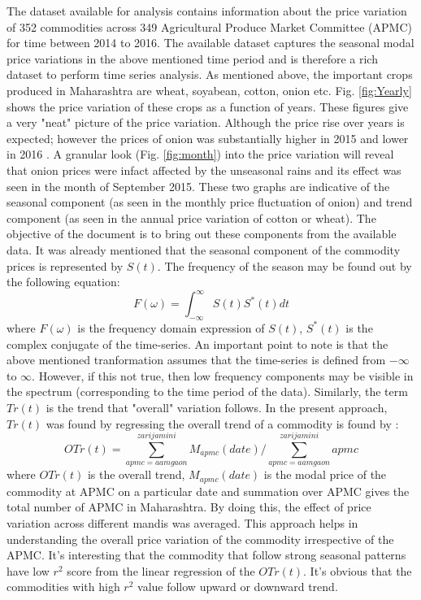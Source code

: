 \documentclass{article}
\begin{document}
The dataset available for analysis contains information about the price variation of 352 commodities across 349 Agricultural Produce Market Committee (APMC) for time between 2014 to 2016. The available dataset captures the seasonal modal price variations in the above mentioned time period and is therefore a rich dataset to perform time series analysis. As mentioned above, the important crops produced in Maharashtra are wheat, soyabean, cotton, onion etc. Fig. \ref{fig:Yearly} shows the price variation of these crops as a function of years. These figures give a very "neat" picture of the price variation. Although the price rise over years is expected; however the prices of onion was substantially higher in 2015 and  lower in 2016 . A granular look (Fig. \ref{fig:month}) into the price variation will reveal that onion prices were infact affected by the unseasonal rains and its effect was seen in the month of September 2015. These two graphs are indicative of the seasonal component (as seen in the monthly price fluctuation of onion) and trend component (as seen in the annual price variation of cotton or wheat). The objective of the document is to bring out these components from the available data. It was already mentioned that the seasonal component of the commodity prices is represented by $S(t)$. The frequency of the season may be found out by the following equation:
\begin{equation}
 F(\omega) = \int_{-\infty}^{\infty}S(t)S^*(t)dt
\end{equation}
where $F(\omega)$ is the frequency domain expression of $S(t)$, $S^*(t)$ is the complex conjugate of the time-series. An important point to note is that the above mentioned tranformation assumes that the time-series is defined from $-\infty $ to $\infty$. However, if this not true, then low frequency components may be visible in the spectrum (corresponding to the time period of the data). Similarly, the term $Tr(t)$ is the trend that "overall" variation follows. In the present approach, $Tr(t)$ was found by regressing the overall trend of a commodity is found by :
\begin{equation}
OTr(t) = \sum_{apmc=aamgaon}^{zarijamini} M_{apmc}(date)/\sum_{apmc=aamgaon}^{zarijamini}apmc
\end{equation}
where $OTr(t)$ is the overall trend, $M_{apmc}(date)$ is the modal price of the commodity at APMC on a particular date and summation over APMC gives the total number of APMC in Maharashtra. By doing this, the effect of price variation across different mandis was averaged. This approach helps in understanding the overall price variation of the commodity irrespective of the APMC. It's interesting that the commodity that follow strong seasonal patterns have low $r^2$ score from the linear regression of the $OTr(t)$. It's obvious that the commodities with high $r^2$ value follow upward or downward trend.  \par
\end{document}
